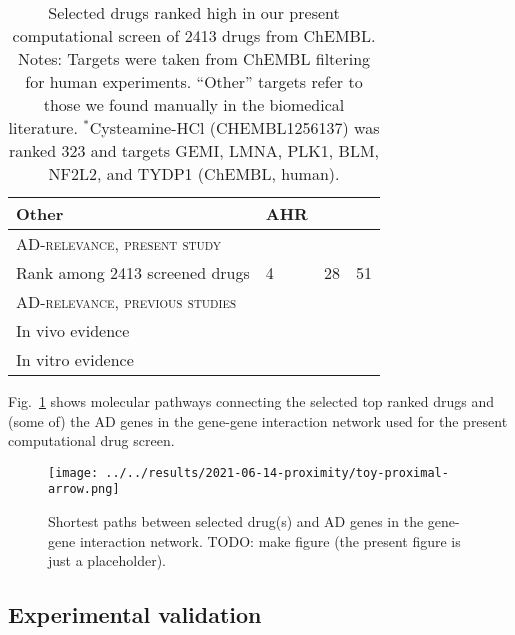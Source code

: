 \documentclass[letterpaper]{article}
\begin{document}
\begin{table}
\begin{tabular}{p{} | p{} p{} p{}}
                                             Other &                                AHR &                        &                                     \\
\midrule
\multicolumn{4}{l}{\scshape AD-relevance, present study} \\
                             Rank among 2413 screened drugs &                                  4 &                     28 &                                  51 \\
\midrule
\multicolumn{4}{l}{\scshape AD-relevance, previous studies} \\
                                  In vivo evidence & \cite{DeMiranda2013,DeMiranda2014} &       \cite{Keene2002} &                \cite{Cicchetti2019} \\
                                 In vitro evidence &      \cite{Lee2019,Rzemieniec2019} &                        &          \cite{Besouw2013,Paul2019} \\
\bottomrule
\end{tabular}
\caption{
Selected drugs ranked high in our present computational screen of 2413 drugs
from ChEMBL.  Notes: Targets were taken from ChEMBL filtering for human
experiments. ``Other'' targets refer to those we found manually in the
biomedical literature. $^\ast$Cysteamine-HCl (CHEMBL1256137) was ranked 323
and targets GEMI, LMNA, PLK1, BLM, NF2L2, and TYDP1 (ChEMBL, human).
}
\label{tab:selected-drugs}
\end{table}

Fig.~\ref{fig:drug-AD-genes-network} shows molecular pathways connecting the
selected top ranked drugs and (some of) the AD genes in the gene-gene
interaction network used for the present computational drug screen.

\begin{figure}
\texttt{[image: ../../results/2021-06-14-proximity/toy-proximal-arrow.png]}
  \caption{Shortest paths between selected drug(s) and AD genes in the
    gene-gene interaction network.  TODO: make figure (the present figure is
    just a placeholder).
}
\label{fig:drug-AD-genes-network}
\end{figure}

\subsection{Experimental validation}
\end{document}
